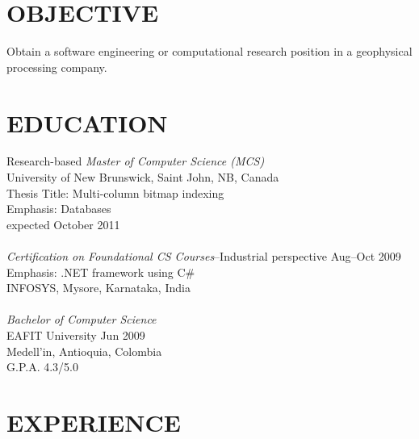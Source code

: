 \documentclass[line,margin]{res}
\begin{document}
\address{19603 Fernhaven, Katy, TX 77449}
\address{(281) 398-9692\\ edvelez.g@gmail.com}

 
\begin{resume}

\section{OBJECTIVE} %
\label{sec:objective}
    Obtain a software engineering or computational research position in a geophysical processing company. 

\section{EDUCATION} %
\label{sec:education}
    Research-based {\sl Master of Computer Science (MCS)} \\
    University of New Brunswick, Saint John, NB, Canada\\
    Thesis Title: Multi-column bitmap indexing\\
    Emphasis: Databases\\
    expected October 2011 \\\\
    {\sl Certification on Foundational CS Courses}--Industrial perspective \hfill Aug--Oct 2009\\
    Emphasis: .NET framework using C\#\\
    INFOSYS, Mysore, Karnataka, India\\\\
    {\sl Bachelor of Computer Science}\\
    EAFIT University \hfill Jun 2009\\
    Medell\a'in, Antioquia, Colombia\\
    G.P.A. 4.3/5.0\\

\section{EXPERIENCE} %
\label{sec:experience}


\end{resume}
\end{document}
